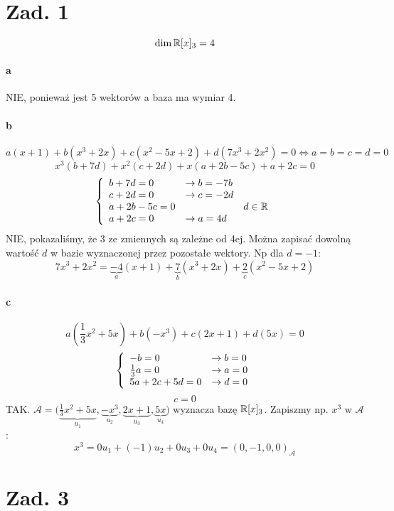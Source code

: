 \documentclass[a4paper,fleqn]{article}
\title{}
\author{}
\date{\today}
\begin{document}
	\section*{Zad. 1}
	\[ \dim \mathbb{R}[x]_3 = 4 \]
	\paragraph{a}
	NIE, ponieważ jest 5 wektorów a baza ma wymiar 4.

	\paragraph{b}
	\[ a(x+1) + b(x^3+2x) + c(x^2-5x+2) + d(7x^3+2x^2) = 0 \Leftrightarrow
		a = b = c = d = 0 \]
	\[ x^3 (b+7d) + x^2 (c+2d) + x (a+2b-5c) + a + 2c = 0 \]
	\[ \left\{
		\begin{array}{l l l}
			b + 7d=0 & \rightarrow b=-7b & \\
			c + 2d = 0 & \rightarrow c=-2d & \\
			a + 2b - 5c = 0 & & d \in \mathbb{R} \\
			a + 2c = 0 & \rightarrow a = 4d &
		\end{array}
		\right. \]
	NIE, pokazaliśmy, że 3 ze zmiennych są zależne od 4ej. Można zapisać
	dowolną wartość $d$ w bazie wyznaczonej przez pozostałe wektory. Np dla
	$d=-1$:
	\[ 7x^3 + 2x^2 = \underbrace{-4}_a (x+1) + \underbrace{7}_b (x^3+2x) +
		\underbrace{2}_c (x^2 - 5x + 2) \]

	\paragraph{c}
	\[ a(\frac 1 3 x^2 + 5x) + b(-x^3) + c(2x + 1) + d(5x) = 0 \]
	\[ \left\{
		\begin{array}{l l}
			-b = 0 & \rightarrow b=0 \\
			\frac 1 3 a = 0 & \rightarrow a = 0 \\
			5a + 2c + 5d = 0 & \rightarrow d = 0
		\end{array}
		\right. \]
	\[ c = 0 \]
	TAK. $\mathcal{A} = \Big(\underbrace{\frac 1 3 x^2 + 5x}_{u_1},
	\underbrace{-x^3}_{u_2}, \underbrace{2x + 1}_{u_3}, \underbrace{5x}_{u_4}\Big)$
	wyznacza bazę $\mathbb{R}[x]_3$. Zapiszmy np. $x^3$ w $\mathcal{A}$:
	\[	x^3 = 0u_1 + (-1)u_2 + 0u_3 + 0u_4 = (0,-1,0,0)_{\mathcal{A}} \]

	\cdots

	\section*{Zad. 3}
\end{document}
